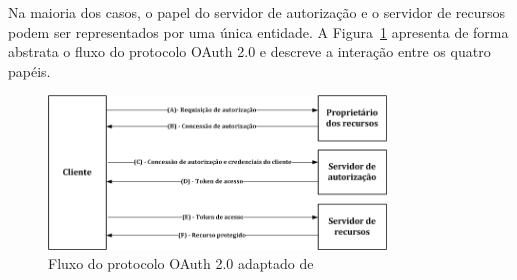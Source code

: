 




Na maioria dos casos, o papel do servidor de autorização e o servidor de recursos podem  ser representados por uma única entidade. A Figura~\ref{fig:diagramaoauth} apresenta de forma abstrata o fluxo do protocolo OAuth 2.0 e descreve a interação entre os quatro papéis.

\begin{figure}[!htb]
\centering
\includegraphics[width=0.8\textwidth]{diagrama_oauth2.png}
\caption{Fluxo do protocolo OAuth 2.0 adaptado de~\cite{rfc6749}}
\label{fig:diagramaoauth}
\end{figure}

